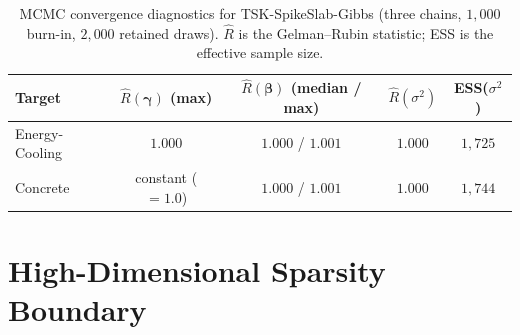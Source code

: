 \documentclass[review,1p,times]{elsarticle}
\begin{document}
\begin{table}[htbp]
\centering
\caption{MCMC convergence diagnostics for TSK-SpikeSlab-Gibbs (three chains, $1{,}000$ burn-in, $2{,}000$ retained draws). $\hat{R}$ is the Gelman--Rubin statistic; ESS is the effective sample size.}
\label{tab:mcmc}
\footnotesize
\begin{tabular}{lcccc}
\toprule
Target & $\hat{R}(\boldsymbol{\gamma})$ (max) & $\hat{R}(\boldsymbol{\beta})$ (median / max) & $\hat{R}(\sigma^2)$ & ESS($\sigma^2$) \\
\midrule
Energy-Cooling & $1.000$ & $1.000$ / $1.001$ & $1.000$ & $1{,}725$ \\
Concrete & constant ($=1.0$) & $1.000$ / $1.001$ & $1.000$ & $1{,}744$ \\
\bottomrule
\end{tabular}
\end{table}

\FloatBarrier

\section{High-Dimensional Sparsity Boundary}
\end{document}
